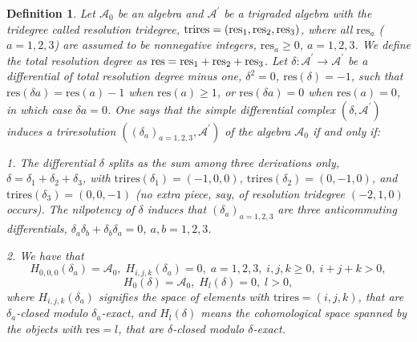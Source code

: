 \documentclass[a4paper,12pt]{article}
\newtheorem{definition}{Definition}
\begin{document}
\begin{definition}
Let $\mathcal{A}_{0}$ be an algebra and $\mathcal{A}^{\prime }$ be a
trigraded algebra with the tridegree called resolution tridegree, $\mathrm{%
trires}=\left( \mathrm{res}_{1},\mathrm{res}_{2},\mathrm{res}_{3}\right) $,
where all $\mathrm{res}_{a}$ ($a=1,2,3$) are assumed to be nonnegative
integers, $\mathrm{res}_{a}\geq 0$, $a=1,2,3$. We define the total
resolution degree as $\mathrm{res}=\mathrm{res}_{1}+\mathrm{res}_{2}+\mathrm{%
res}_{3}$. Let $\delta :\mathcal{A}^{\prime }\rightarrow \mathcal{A}^{\prime
}$ be a differential of total resolution degree minus one, $\delta ^{2}=0$, $%
\mathrm{res}\left( \delta \right) =-1$, such that $\mathrm{res}\left( \delta
a\right) =\mathrm{res}\left( a\right) -1$ when $\mathrm{res}\left( a\right)
\geq 1$, or $\mathrm{res}\left( \delta a\right) =0$ when $\mathrm{res}\left(
a\right) =0$, in which case $\delta a=0$. One says that the simple
differential complex $\left( \delta ,\mathcal{A}^{\prime }\right) $ induces
a triresolution $\left( \left( \delta _{a}\right) _{a=1,2,3},\mathcal{A}%
^{\prime }\right) $ of the algebra $\mathcal{A}_{0}$ if and only if:

1. The differential $\delta $ splits as the sum among three derivations
only, $\delta =\delta _{1}+\delta _{2}+\delta _{3}$, with $\mathrm{trires}%
\left( \delta _{1}\right) =\left( -1,0,0\right) $, $\mathrm{trires}\left(
\delta _{2}\right) =\left( 0,-1,0\right) $, and $\mathrm{trires}\left(
\delta _{3}\right) =\left( 0,0,-1\right) $ (no extra piece, say, of
resolution tridegree $\left( -2,1,0\right) $ occurs). The nilpotency of $%
\delta $ induces that $\left( \delta _{a}\right) _{a=1,2,3}$ are three
anticommuting differentials, $\delta _{a}\delta _{b}+\delta _{b}\delta
_{a}=0 $, $a,b=1,2,3$.

2. We have that 
\begin{equation}
H_{0,0,0}\left( \delta _{a}\right) =\mathcal{A}_{0},\;H_{i,j,k}\left( \delta
_{a}\right) =0,\;a=1,2,3,\;i,j,k\geq 0,\;i+j+k>0,  \label{sp3.ap1}
\end{equation}
\begin{equation}
H_{0}\left( \delta \right) =\mathcal{A}_{0},\;H_{l}\left( \delta \right)
=0,\;l>0,  \label{sp3.ap2}
\end{equation}
where $H_{i,j,k}\left( \delta _{a}\right) $ signifies the space of elements
with $\mathrm{trires}=(i,j,k)$, that are $\delta _{a}$-closed modulo $\delta
_{a}$-exact, and $H_{l}\left( \delta \right) $ means the cohomological space
spanned by the objects with $\mathrm{res}=l$, that are $\delta $-closed
modulo $\delta $-exact.
\end{definition}
\end{document}
